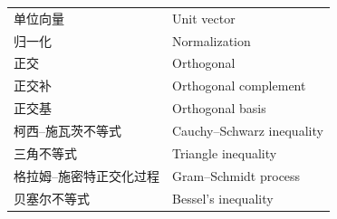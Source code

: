 \documentclass{ctexart}
\begin{document}
\begin{center}
\begin{longtable}{|>{\raggedright\arraybackslash}p{5cm}|>{\raggedright\arraybackslash}p{8cm}|}
			单位向量 & Unit vector \\
			归一化 & Normalization \\
			正交 & Orthogonal \\
			正交补 & Orthogonal complement \\
			正交基 & Orthogonal basis \\
			柯西–施瓦茨不等式 & Cauchy–Schwarz inequality \\
			三角不等式 & Triangle inequality \\
			格拉姆–施密特正交化过程 & Gram–Schmidt process \\
			贝塞尔不等式 & Bessel's inequality \\
		\end{longtable}
	\end{center}
\end{document}
